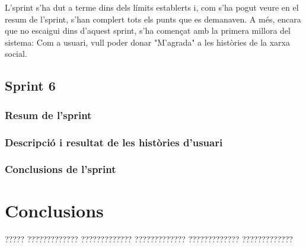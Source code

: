 \documentclass[11pt,catalan,listoffigures,listoftables]{tfgetsinf}
\begin{document}
L'sprint s'ha dut a terme dins dels límits establerts i, com s'ha pogut veure en el resum de l'sprint, s'han complert tots els punts que es demanaven. A més, encara que no escaigui dins d'aquest sprint, s'ha començat amb la primera millora del sistema: Com a usuari, vull poder donar "M'agrada" a les històries de la xarxa social.

\section{Sprint 6}

\subsection{Resum de l'sprint}

\subsection{Descripció i resultat de les històries d’usuari}

\subsection{Conclusions de l'sprint}


\chapter{Conclusions}

????? ????????????? ????????????? ????????????? ????????????? ????????????? 

\end{document}
